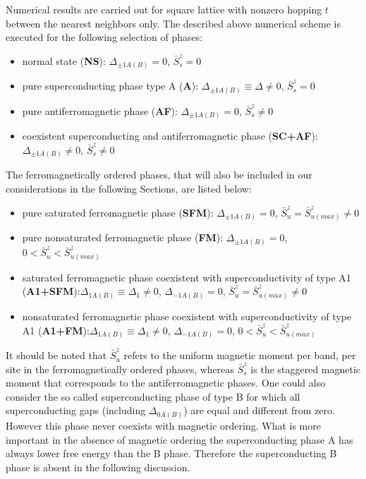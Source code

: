 \documentclass[aps,prb,showpacs,reprint]{revtex4-1}
\begin{document}
Numerical results are carried out for square lattice with nonzero hopping $t$
between the nearest neighbors only.\newline
The described above numerical scheme is executed for the following selection
of phases:
\begin{itemize}
 \item normal state ({\bf NS}): $\Delta_{\pm1A(B)}=0$, $\bar{S}^z_s=0$
 \item pure superconducting phase type A ({\bf A}):
$\Delta_{\pm1A(B)}\equiv\Delta\neq0$, $\bar{S}^z_s=0$
 \item pure antiferromagnetic phase ({\bf AF}): $\Delta_{\pm1A(B)}=0$,
$\bar{S}^z_s\neq0$
 \item coexistent superconducting and antiferromagnetic phase ({\bf SC+AF}):
$\Delta_{\pm1A(B)}\neq0$, $\bar{S}^z_s\neq0$
\end{itemize}
The ferromagnetically ordered phases, that will also be included
in our
considerations in the following Sections, are listed below:
\begin{itemize}
 \item pure saturated ferromagnetic phase ({\bf SFM}): $\Delta_{\pm1A(B)}=0$,
$\bar{S}^z_u=\bar{S}^z_{u(max)}\neq0$
 \item pure nonsaturated ferromagnetic phase ({\bf FM}):
$\Delta_{\pm1A(B)}=0$, $0<\bar{S}^z_u<\bar{S}^z_{u(max)}$
 \item saturated ferromagnetic phase coexistent with superconductivity of type
A1 ({\bf A1+SFM}):\newline $\Delta_{1A(B)}\equiv \Delta_{1}\neq0$,
$\Delta_{-1A(B)}=0$, $\bar{S}^z_u=\bar{S}^z_{u(max)}\neq0$
 \item nonsaturated ferromagnetic phase coexistent with superconductivity of
type
A1 ({\bf A1+FM}):\newline $\Delta_{1A(B)}\equiv \Delta_{1}\neq0$,
$\Delta_{-1A(B)}=0$,
$0<\bar{S}^z_u<\bar{S}^z_{u(max)}$
\end{itemize}
It should be noted that $\bar{S}^z_u$ refers to the uniform magnetic moment per
band, per site in the ferromagnetically ordered phases, whereas
$\bar{S}^z_s$ is the
staggered magnetic moment that corresponds to the antiferromagnetic phases.
One could also consider the so called superconducting phase of type B for which
all superconducting gaps (including $\Delta_{0 A(B)}$) are equal and different
from zero. However this phase never coexists with magnetic ordering. What is
more important in the absence of magnetic ordering the superconducting phase A
has always lower free energy than the B phase. Therefore the superconducting B phase is absent
in the following discussion.
\end{document}
